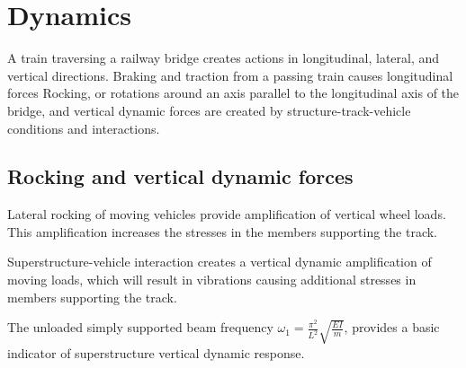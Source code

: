 \section{Dynamics}
A train traversing a railway bridge creates actions in longitudinal, lateral, and vertical directions. Braking and traction from a passing train causes longitudinal forces
Rocking, or rotations around an axis parallel to the longitudinal axis of the bridge, and vertical dynamic forces are created by structure-track-vehicle conditions and interactions.
\subsection{Rocking and vertical dynamic forces}
Lateral rocking of moving vehicles provide amplification of vertical  wheel loads. This amplification increases the stresses in the members supporting the track.

Superstructure-vehicle interaction creates a vertical dynamic amplification of moving loads, which will result in vibrations causing additional stresses in members supporting the track.

The unloaded simply supported beam frequency $\omega_1 = \frac{\pi^2}{L^2}\sqrt{\frac{EI}{m}}$, provides a basic indicator of superstructure vertical dynamic response.
